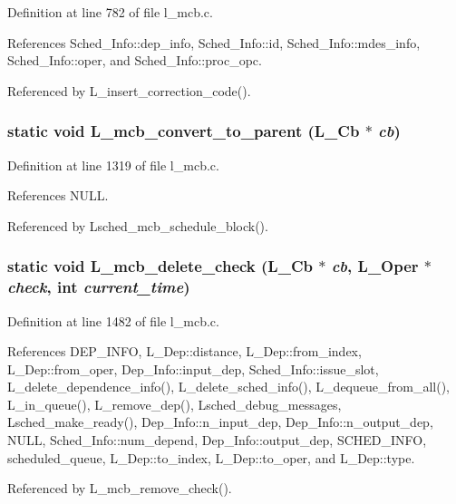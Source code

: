 Definition at line 782 of file l\_\-mcb.c.

References Sched\_\-Info::dep\_\-info, Sched\_\-Info::id, Sched\_\-Info::mdes\_\-info, Sched\_\-Info::oper, and Sched\_\-Info::proc\_\-opc.

Referenced by L\_\-insert\_\-correction\_\-code().
\subsubsection{\setlength{\rightskip}{0pt plus 5cm}static void L\_\-mcb\_\-convert\_\-to\_\-parent (L\_\-Cb $\ast$ {\em cb})\hspace{0.3cm}{\tt  [static]}}\label{l__mcb_8c_0f7dc4af57eefd0c374df42f684ca73b}




Definition at line 1319 of file l\_\-mcb.c.

References NULL.

Referenced by Lsched\_\-mcb\_\-schedule\_\-block().
\subsubsection{\setlength{\rightskip}{0pt plus 5cm}static void L\_\-mcb\_\-delete\_\-check (L\_\-Cb $\ast$ {\em cb}, L\_\-Oper $\ast$ {\em check}, int {\em current\_\-time})\hspace{0.3cm}{\tt  [static]}}\label{l__mcb_8c_707fbd6c45fa76a337bac75eda82282e}




Definition at line 1482 of file l\_\-mcb.c.

References DEP\_\-INFO, L\_\-Dep::distance, L\_\-Dep::from\_\-index, L\_\-Dep::from\_\-oper, Dep\_\-Info::input\_\-dep, Sched\_\-Info::issue\_\-slot, L\_\-delete\_\-dependence\_\-info(), L\_\-delete\_\-sched\_\-info(), L\_\-dequeue\_\-from\_\-all(), L\_\-in\_\-queue(), L\_\-remove\_\-dep(), Lsched\_\-debug\_\-messages, Lsched\_\-make\_\-ready(), Dep\_\-Info::n\_\-input\_\-dep, Dep\_\-Info::n\_\-output\_\-dep, NULL, Sched\_\-Info::num\_\-depend, Dep\_\-Info::output\_\-dep, SCHED\_\-INFO, scheduled\_\-queue, L\_\-Dep::to\_\-index, L\_\-Dep::to\_\-oper, and L\_\-Dep::type.

Referenced by L\_\-mcb\_\-remove\_\-check().
